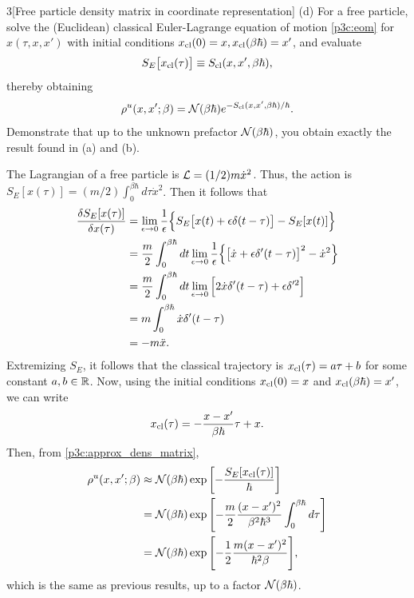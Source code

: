 \documentclass[12pt]{article}
\begin{document}
\begin{problem}{3}[Free particle density matrix in coordinate representation]
(d) For a free particle, solve the (Euclidean) classical Euler-Lagrange equation
of motion \cref{p3c:eom} for $x(\tau,x,x')$ with initial conditions
$x_{\text{cl}}(0)=x,x_{\text{cl}}(\beta\hbar)=x'$, and evaluate
\begin{equation}
    S_E\qty[x_{\text{cl}}(\tau)]\equiv S_{\text{cl}}(x,x',\beta\hbar), 
\end{equation}
thereby obtaining
\begin{equation}\label{p3d:dens_matrix}
    \rho^u(x,x';\beta)=\mathcal{N}(\beta\hbar)e^{-S_{\text{cl}}(x,x',\beta\hbar)/\hbar}. 
\end{equation}
Demonstrate that up to the unknown prefactor $\mathcal{N}(\beta\hbar)$, you obtain
exactly the result found in (a) and (b).
\begin{solution}
    The Lagrangian of a free particle is $\mathcal{L}=(1/2)m\dot{x}^2$. Thus, the action is 
$S_E[x(\tau)]=(m/2)\int_0^{\beta\hbar}d\tau\dot{x}^2$. Then it follows that
\begin{align}
    \frac{\delta S_E[x(\tau)]}{\delta x(\tau)}
    &=\lim_{\epsilon\to0}\frac1\epsilon\qty{S_E\qty[x(t)+\epsilon\delta(t-\tau)]-S_E[x(t)]}\notag\\
    &=\frac{m}{2}\int_0^{\beta\hbar}dt\lim_{\epsilon\to0}\frac1\epsilon
    \qty{\qty[\dot{x}+\epsilon\delta'(t-\tau)]^2-\dot{x}^2}\notag\\
    &=\frac{m}{2}\int_0^{\beta\hbar}dt\lim_{\epsilon\to0}
    \qty[2\dot{x}\delta'(t-\tau)+\epsilon\delta'^2]\notag\\
    &=m\int_0^{\beta\hbar}\dot{x}\delta'(t-\tau)\notag\\
    &=-m\ddot{x}.
\end{align}
Extremizing $S_E$, it follows that the classical trajectory
is $x_{\text{cl}}(\tau)=a\tau+b$ for some constant
$a,b\in\mathbb{R}$. Now, using the initial conditions $x_{\text{cl}}(0)=x$ and
$x_{\text{cl}}(\beta\hbar)=x'$, we can write
\begin{equation}
    x_{\text{cl}}(\tau)=-\frac{x-x'}{\beta\hbar}\tau+x .
\end{equation}
Then, from \eqref{p3c:approx_dens_matrix},
\begin{align}
    \rho^u(x,x';\beta)
    &\approx \mathcal{N}(\beta\hbar)\exp\qty[-\frac{S_E[x_{\text{cl}}(\tau)]}{\hbar}]\notag\\
    &=\mathcal{N}(\beta\hbar)\exp\qty[-\frac{m}{2}\frac{(x-x')^2}{\beta^2\hbar^3}\int_0^{\beta\hbar}d\tau]\notag\\
    &=\mathcal{N}(\beta\hbar)\exp\qty[-\frac12\frac{m(x-x')^2}{\hbar^2\beta}],
\end{align}
which is the same as previous results, up to a factor $\mathcal{N}(\beta\hbar)$.   
\end{solution}


\end{problem}
\end{document}
